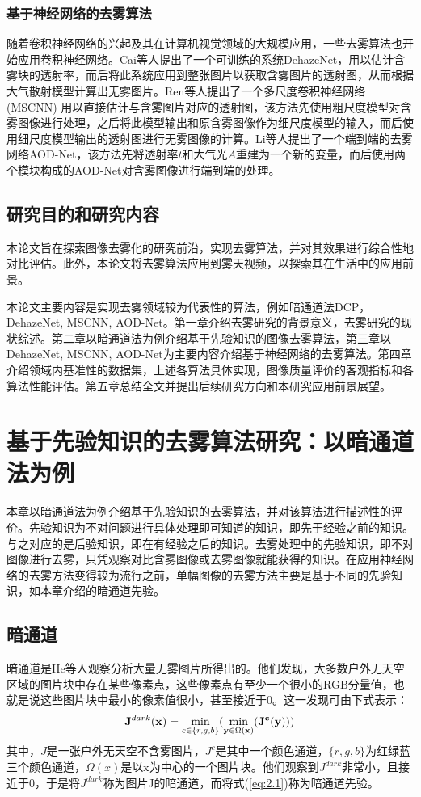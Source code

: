 \documentclass[a4paper, 12pt, oneside]{report}
\begin{document}
{\subsection{基于神经网络的去雾算法\quad}
随着卷积神经网络的兴起及其在计算机视觉领域的大规模应用，一些去雾算法也开始应用卷积神经网络。Cai\cite{ref16}等人提出了一个可训练的系统DehazeNet，用以估计含雾块的透射率，而后将此系统应用到整张图片以获取含雾图片的透射图，从而根据大气散射模型计算出无雾图片。Ren\cite{ref17}等人提出了一个多尺度卷积神经网络 (MSCNN) 用以直接估计与含雾图片对应的透射图，该方法先使用粗尺度模型对含雾图像进行处理，之后将此模型输出和原含雾图像作为细尺度模型的输入，而后使用细尺度模型输出的透射图进行无雾图像的计算。Li\cite{ref18}等人提出了一个端到端的去雾网络AOD-Net，该方法先将透射率$t$和大气光$A$重建为一个新的变量，而后使用两个模块构成的AOD-Net对含雾图像进行端到端的处理。

\section{研究目的和研究内容\quad}
本论文旨在探索图像去雾化的研究前沿，实现去雾算法，并对其效果进行综合性地对比评估。此外，本论文将去雾算法应用到雾天视频，以探索其在生活中的应用前景。

本论文主要内容是实现去雾领域较为代表性的算法，例如暗通道法DCP，DehazeNet, MSCNN, AOD-Net。第一章介绍去雾研究的背景意义，去雾研究的现状综述。第二章以暗通道法为例介绍基于先验知识的图像去雾算法，第三章以DehazeNet, MSCNN, AOD-Net为主要内容介绍基于神经网络的去雾算法。第四章介绍领域内基准性的数据集，上述各算法具体实现，图像质量评价的客观指标和各算法性能评估。第五章总结全文并提出后续研究方向和本研究应用前景展望。


\chapter{基于先验知识的去雾算法研究：以暗通道法为例\quad}
本章以暗通道法为例介绍基于先验知识的去雾算法，并对该算法进行描述性的评价。先验知识为不对问题进行具体处理即可知道的知识，即先于经验之前的知识。与之对应的是后验知识，即在有经验之后的知识。去雾处理中的先验知识，即不对图像进行去雾，只凭观察对比含雾图像或去雾图像就能获得的知识。在应用神经网络的去雾方法变得较为流行之前，单幅图像的去雾方法主要是基于不同的先验知识，如本章介绍的暗通道先验。
\section{暗通道\quad }
暗通道是He\cite{ref1}等人观察分析大量无雾图片所得出的。他们发现，大多数户外无天空区域的图片块中存在某些像素点，这些像素点有至少一个很小的RGB分量值，也就是说这些图片块中最小的像素值很小，甚至接近于0。这一发现可由下式表示：
\begin{equation} \label{eq:2.1}
{\bf J}^{dark}{\bf (x)} = \min_{c \in \{r, g, b\}}(\min_{{\bf y} \in \Omega({\bf x})}(\bf J^c(y)))
\end{equation}
其中，$J$是一张户外无天空不含雾图片，$J^c$是其中一个颜色通道，$\{ r, g, b\}$为红绿蓝三个颜色通道，$\Omega(x)$是以x为中心的一个图片块。他们观察到$J^{dark}$非常小，且接近于0，于是将$J^{dark}$称为图片J的暗通道，而将式(\ref{eq:2.1})称为暗通道先验。

}
\end{document}
